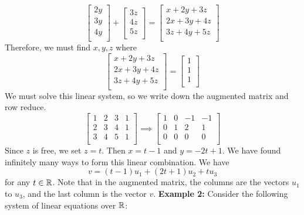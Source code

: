 \documentclass{article}
\begin{document}
\begin{examples}
\[\begin{bmatrix}
      2y\\
      3y\\
      4y\\
    \end{bmatrix}+
    \begin{bmatrix}
      3z\\
      4z\\
      5z\\
    \end{bmatrix}
    =
    \begin{bmatrix}
      x + 2y + 3z\\
      2x + 3y + 4z\\
      3z + 4y + 5z\\
  \end{bmatrix}\]
  Therefore, we must find $x, y, z$ where \[
    \begin{bmatrix}
      x + 2y + 3z\\
      2x + 3y + 4z\\
      3z + 4y + 5z\\
    \end{bmatrix}
    =
    \begin{bmatrix}
      1\\
      1\\
      1\\
  \end{bmatrix}\]
  We must solve this linear system, so we write down the augmented matrix and row reduce.
  \[
    \begin{bmatrix}
      1 & 2 & 3 & 1\\
      2 & 3 & 4 & 1\\
      3 & 4 & 5 & 1\\
    \end{bmatrix}
    \implies
    \begin{bmatrix}
      1 & 0 & -1 & -1\\
      0 & 1 & 2 & 1\\
      0 & 0 & 0 & 0\\
    \end{bmatrix}
  \]
  Since $z$ is free, we set $z = t$. Then $x = t-1$ and $y = -2t + 1$. We have found infinitely many ways to form this linear combination. We have \[
    v = (t-1)u_1 + (2t+1)u_2 + tu_3
  \]
  for any $t \in \mathbb{R}$. Note that in the augmented matrix, the columns are the vectors $u_1$ to $u_3$, and the last column is the vector $v$.\newline
  \textbf{Example 2:}\newline
  Consider the following system of linear equations over $\mathbb{R}$:

\end{examples}
\end{document}

